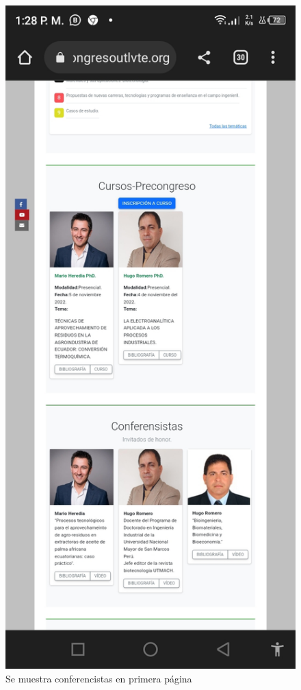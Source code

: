 \documentclass[a4paper,14px]{article}
\begin{document}
\begin{minipage}[H]{0.45\linewidth}
\begin{figure}[H]
  \centering
  \includegraphics[scale=0.3]{index3.jpg}
  \caption{Se muestra conferencistas en primera página }
  \label{fig:arquitectura1}
\end{figure}
  
\end{minipage}
\end{document}

